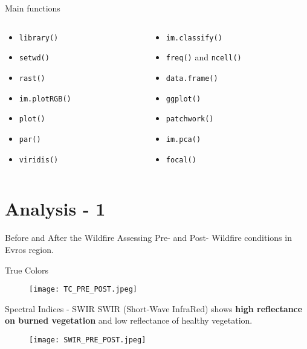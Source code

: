 \documentclass{beamer} %
\begin{document}
\begin{frame}{Main functions}
\bigskip
\begin{columns}
\begin{column}{0.5\textwidth}
\begin{itemize}
    \item    \texttt{library()} 
    \item    \texttt{setwd()} 
    \item    \texttt{rast()} 
    \item    \texttt{im.plotRGB()}
    \item    \texttt{plot()}
    \item    \texttt{par()}
    \item    \texttt{viridis()}
\end{itemize}
\end{column}
\begin{column}{0.5\textwidth}  
 \begin{itemize}
    \item    \texttt{im.classify()}
    \item    \texttt{freq()} and \texttt{ncell()}
    \item    \texttt{data.frame()}
    \item    \texttt{ggplot()}
    \item    \texttt{patchwork()}
    \item    \texttt{im.pca()} 
    \item    \texttt{focal()}
    \end{itemize}
\end{column}
\end{columns}
\end{frame}

\section{Analysis - 1} 
\begin{frame}{Before and After the Wildfire}
\centering
Assessing Pre- and Post- Wildfire conditions in Evros region. 

\bigskip

\centering True Colors

\begin{figure}
    \centering
    \texttt{[image: TC\_PRE\_POST.jpeg]}
\end{figure}
\end{frame}


\begin{frame}{Spectral Indices -  SWIR}
SWIR (Short-Wave InfraRed) shows \textbf{high reflectance on burned vegetation} and low reflectance of healthy vegetation.

 \bigskip
 
 \begin{figure}
    \centering
    \texttt{[image: SWIR\_PRE\_POST.jpeg]}
   \end{figure}
\end{frame}
\end{document}
